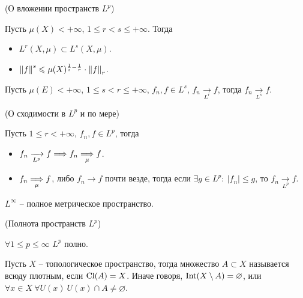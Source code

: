 \begin{theorem}(О вложении пространств $L^p$)
    
    Пусть $\mu(X) < +\infty$, $1 \leqslant r < s \leqslant +\infty$.
    Тогда
    \begin{itemize}
        \item $L^r(X, \mu) \subset L^s(X, \mu)$.
        \item $\left\lVert f\right\rVert^s \leqslant \mu(X)^{\frac{1}{s} - \frac{1}{r}}
               \cdot \left\lVert f\right\rVert_r$.
    \end{itemize} 
\end{theorem}

\begin{corollary}
    Пусть $\mu(E) < +\infty$, $1 \leqslant s < r \leqslant +\infty$, $f_n, f \in L^s$,
    $f_n \xrightarrow[L^r]{} f$, тогда $f_n \xrightarrow[L^s]{} f$.
\end{corollary}

\begin{theorem}(О сходимости в $L^p$ и по мере)
    
    Пусть $1 \leqslant r < +\infty$, $f_n, f \in L^p$, тогда
    \begin{itemize}
        \item $f_n \xrightarrow[L^p]{} f \Longrightarrow f_n \underset{\mu}{\Longrightarrow} f$.
        \item $f_n \underset{\mu}{\Longrightarrow} f$, либо $f_n \to f$ почти везде, тогда
            если $\exists g \in L^p\colon~ |f_n| \leqslant g$, то
            $f_n \xrightarrow[L^p]{} f$.
    \end{itemize} 
\end{theorem}

\begin{remark}
    $L^{\infty}$ -- полное метрическое пространство.
\end{remark}

\begin{theorem}(Полнота пространств $L^p$)
    
    $\forall 1 \leqslant p \leqslant \infty$ $L^p$ полно.
\end{theorem}

\begin{definition}
    Пусть $X$ -- топологическое пространство, тогда множество
    $A \subset X$ называется всюду плотным, если $\operatorname{Cl}(A) = X$.
    Иначе говоря, $\operatorname{Int}(X \setminus A) = \varnothing$, 
    или \\ $\forall x \in X~ \forall U(x)~ U(x) \cap A \neq \varnothing$.
\end{definition}

